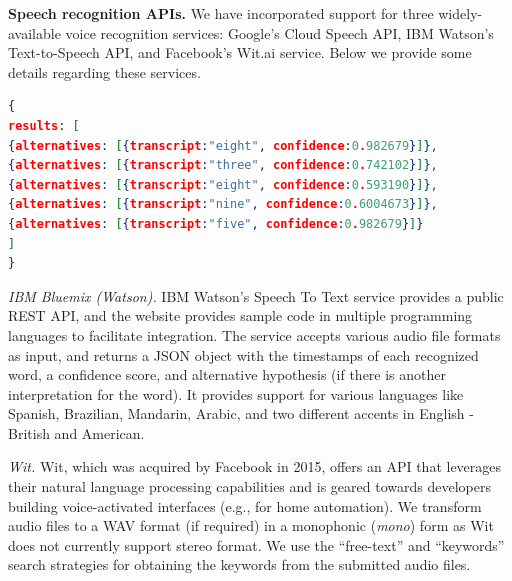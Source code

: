 
\textbf{Speech recognition APIs.}
We have incorporated support for three widely-available voice recognition services: Google's Cloud Speech API,
IBM Watson's Text-to-Speech API, and Facebook's Wit.ai service. Below we 
provide some details regarding these services.

\begin{lstlisting}[language=json,firstnumber=1,caption={Example response from IBM Watson's API for an audio challenge from Google \re v2.a.},label={lst:IBM}]
{
results: [
{alternatives: [{transcript:"eight", confidence:0.982679}]},
{alternatives: [{transcript:"three", confidence:0.742102}]},
{alternatives: [{transcript:"eight", confidence:0.593190}]},
{alternatives: [{transcript:"nine", confidence:0.6004673}]},
{alternatives: [{transcript:"five", confidence:0.982679}]}
]
}

\end{lstlisting}

\emph{IBM Bluemix (Watson).} IBM Watson's Speech To Text service provides a public REST API, and the website provides 
sample code in multiple programming languages to facilitate integration.
The service accepts various audio file formats as input, and returns a JSON object
with the timestamps of each recognized word, a confidence score, and alternative hypothesis (if there is 
another interpretation for the word). It provides support for various languages 
like Spanish, Brazilian, Mandarin, Arabic, and two different accents in English - British and American.

\emph{Wit.} Wit, which was acquired by Facebook in 2015, offers an API that leverages their natural language processing
capabilities and is geared towards developers building voice-activated interfaces (e.g., for home automation). We transform 
audio files to a WAV format (if required) in a monophonic (\emph{mono}) form as Wit does not currently support stereo format.
We use the ``free-text'' and ``keywords'' search strategies for obtaining the keywords from the submitted audio files.

